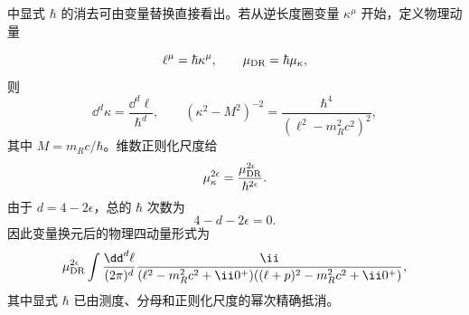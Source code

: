 \begin{derivation}[标量四次相互作用的一圈泡积分]
 中显式 \(\hbar\) 的消去可由变量替换直接看出。若从逆长度圈变量 \(\kappa^\mu\) 开始，定义物理动量

\begin{equation*}
 \ell^\mu=\hbar\kappa^\mu,
 \qquad
 \mu_{\rm DR}=\hbar\mu_\kappa,
\end{equation*}
则
\begin{equation*}
 \dd^d \kappa=\frac{\dd^d \ell}{\hbar^d},
 \qquad
 (\kappa^2-M^2)^{-2}
 =\frac{\hbar^4}{(\ell^2-m_R^2c^2)^2},
\end{equation*}
其中 \(M=m_Rc/\hbar\)。维数正则化尺度给
\begin{equation*}
 \mu_\kappa^{2\epsilon}
 =\frac{\mu_{\rm DR}^{2\epsilon}}{\hbar^{2\epsilon}}.
\end{equation*}
由于 \(d=4-2\epsilon\)，总的 \(\hbar\) 次数为
\begin{equation*}
 4-d-2\epsilon=0.
\end{equation*}
因此变量换元后的物理四动量形式为
\begin{equation*}
 \mu_{\rm DR}^{2\epsilon}
 \int\frac{\dd^d \ell}{(2\pi)^d}
 \frac{\ii}{(\ell^2-m_R^2c^2+\ii0^+)
 ((\ell+p)^2-m_R^2c^2+\ii0^+)},
\end{equation*}
其中显式 $\hbar$ 已由测度、分母和正则化尺度的幂次精确抵消。


\end{derivation}
